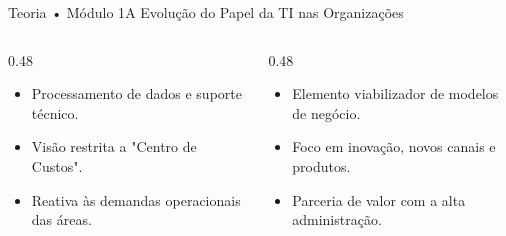 \begin{senaiframe}{Teoria • Módulo 1}{A Evolução do Papel da TI nas Organizações}
  \begin{columns}[t]
    \begin{column}{0.48\textwidth}
      \begin{tcolorbox}[senairedcard, title={TI Tradicional (Passado)}]
        \begin{itemize}
          \item Processamento de dados e suporte técnico.
          \item Visão restrita a "Centro de Custos".
          \item Reativa às demandas operacionais das áreas.
        \end{itemize}
      \end{tcolorbox}
    \end{column}
    \begin{column}{0.48\textwidth}
      \begin{tcolorbox}[senaigreencard, title={TI Estratégica (Presente)}]
        \begin{itemize}
          \item Elemento viabilizador de modelos de negócio.
          \item Foco em inovação, novos canais e produtos.
          \item Parceria de valor com a alta administração.
        \end{itemize}
      \end{tcolorbox}
    \end{column}
  \end{columns}
\end{senaiframe}

